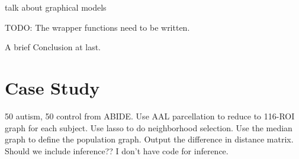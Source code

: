 \documentclass{nature}
\begin{document}
{\color{red}talk about graphical models}

{\color{red}TODO: The wrapper functions need to be written.}

A brief Conclusion at last.

\section{Case Study}

{\color{red}50 autism, 50 control from ABIDE. Use AAL parcellation to reduce to
116-ROI graph
for each subject. Use lasso to do neighborhood selection. Use the median graph
to
define the population graph. Output the difference in distance matrix. Should we
include inference?? I don't have code for inference.}

\newpage
\appendix
\end{document}
